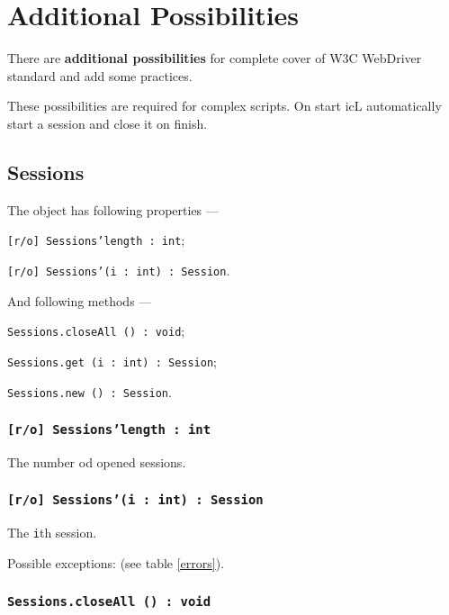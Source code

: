 

\section{Additional Possibilities}

There are {\bf additional possibilities} for complete cover of W3C WebDriver standard and add some practices.

These possibilities are required for complex scripts. On start icL automatically start a session and close it on finish.

\subsection{{\color{orange} Sessions}}

The object \sessions{} has following properties —
\begin{icItems}
	\item \texttt{[r/o] Sessions'length : int};
	\item \texttt{[r/o] Sessions'(i : int) : Session}.
\end{icItems}

And following methods —
\begin{icItems}
	\item \texttt{Sessions.closeAll () : void};
	\item \texttt{Sessions.get (i : int) : Session};
	\item \texttt{Sessions.new () : Session}.
\end{icItems}

\subsubsection{\texttt{[r/o] Sessions'length : int}}

The number od opened sessions.

\subsubsection{\texttt{[r/o] Sessions'(i : int) : Session}}

The \texttt{i}th session.

Possible exceptions:  (see table \ref{errors}).

\subsubsection{\texttt{Sessions.closeAll () : void}}

